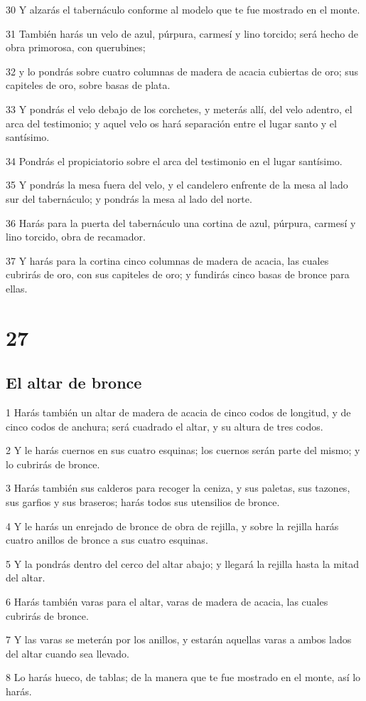 \par 30 Y alzarás el tabernáculo conforme al modelo que te fue mostrado en el monte.
\par 31 También harás un velo de azul, púrpura, carmesí y lino torcido; será hecho de obra primorosa, con querubines;
\par 32 y lo pondrás sobre cuatro columnas de madera de acacia cubiertas de oro; sus capiteles de oro, sobre basas de plata.
\par 33 Y pondrás el velo debajo de los corchetes, y meterás allí, del velo adentro, el arca del testimonio; y aquel velo os hará separación entre el lugar santo y el santísimo.
\par 34 Pondrás el propiciatorio sobre el arca del testimonio en el lugar santísimo.
\par 35 Y pondrás la mesa fuera del velo, y el candelero enfrente de la mesa al lado sur del tabernáculo; y pondrás la mesa al lado del norte.
\par 36 Harás para la puerta del tabernáculo una cortina de azul, púrpura, carmesí y lino torcido, obra de recamador.
\par 37 Y harás para la cortina cinco columnas de madera de acacia, las cuales cubrirás de oro, con sus capiteles de oro; y fundirás cinco basas de bronce para ellas.

\chapter{27}

\section*{El altar de bronce}

\par 1 Harás también un altar de madera de acacia de cinco codos   de longitud, y de cinco codos de anchura; será cuadrado el altar, y su altura de tres codos.
\par 2 Y le harás cuernos en sus cuatro esquinas; los cuernos serán parte del mismo; y lo cubrirás de bronce.
\par 3 Harás también sus calderos para recoger la ceniza, y sus paletas, sus tazones, sus garfios y sus braseros; harás todos sus utensilios de bronce.
\par 4 Y le harás un enrejado de bronce de obra de rejilla, y sobre la rejilla harás cuatro anillos de bronce a sus cuatro esquinas.
\par 5 Y la pondrás dentro del cerco del altar abajo; y llegará la rejilla hasta la mitad del altar.
\par 6 Harás también varas para el altar, varas de madera de acacia, las cuales cubrirás de bronce.
\par 7 Y las varas se meterán por los anillos, y estarán aquellas varas a ambos lados del altar cuando sea llevado.
\par 8 Lo harás hueco, de tablas; de la manera que te fue mostrado en el monte, así lo harás.

